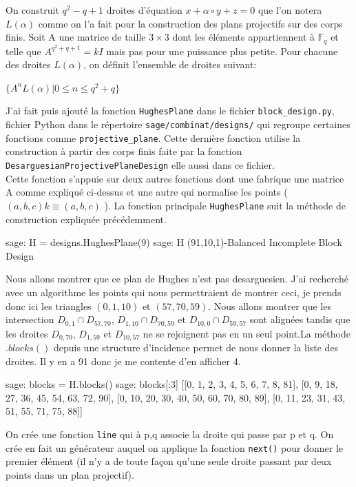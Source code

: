 \documentclass[a4paper]{article}
\begin{document}
        On construit $q^2-q+1$ droites d'équation $x + \alpha \circ y + z = 0$ que l'on notera $L(\alpha)$ comme on l'a fait pour la construction des plans projectifs sur des corps finis. Soit A une matrice de taille $3\times3$ dont les éléments appartiennent à $\mathbb{F}_q$ et telle que $A^{q^2+q+1}=kI$ mais pas pour une puissance plus petite. Pour chacune des droites $L(\alpha)$, on définit l'ensemble de droites suivant:
\begin{center}
 $ \{A^nL(\alpha) | 0 \leq n \leq q^2 + q\}$
\end{center}
\smallskip
J'ai fait puis ajouté la fonction \texttt{HughesPlane} dans le fichier \texttt{block\_design.py}, fichier Python dans le répertoire \texttt{sage/combinat/designs/} qui regroupe certaines fonctions comme \texttt{projective\_plane}. Cette dernière fonction utilise la construction à partir des corps finis faite par la fonction \\ \texttt{DesarguesianProjectivePlaneDesign} elle aussi dans ce fichier.\\
\newpage
Cette fonction s'appuie sur deux autres fonctions dont une fabrique une matrice A comme expliqué ci-dessus et une autre qui normalise les points ( $(a,b,c)k \equiv (a,b,c)$ ). La fonction principale \texttt{HughesPlane} suit la méthode de construction expliquée précédemment.
\begin{sageverbatim}
 sage: H = designs.HughesPlane(9)
 sage: H
 (91,10,1)-Balanced Incomplete Block Design
\end{sageverbatim}
Nous allons montrer que ce plan de Hughes n'est pas desarguesien. J'ai recherché avec un algorithme les points qui nous permettraient de montrer ceci, je prends donc ici les triangles $(0,1,10)$ et $(57, 70, 59)$. Nous allons montrer que les intersection $D_{0,1} \cap D_{57,70}$, $D_{1,10} \cap D_{70,59}$ et $D_{10,0} \cap D_{59,57}$ sont alignées tandis que les droites $D_{0,70}$, $D_{1,59}$ et $D_{10,57}$ ne se rejoignent pas en un seul point.La méthode $.blocks()$ depuis une structure d'incidence permet de nous donner la liste des droites. Il y en a 91 donc je me contente d'en afficher 4.
\begin{sageverbatim}
 sage: blocks = H.blocks()
 sage: blocks[:3]
 [[0, 1, 2, 3, 4, 5, 6, 7, 8, 81],
 [0, 9, 18, 27, 36, 45, 54, 63, 72, 90],
 [0, 10, 20, 30, 40, 50, 60, 70, 80, 89],
 [0, 11, 23, 31, 43, 51, 55, 71, 75, 88]]
\end{sageverbatim}
On crée une fonction \texttt{line} qui à p,q associe la droite qui passe par p et q. On crée en fait un générateur auquel on applique la fonction \texttt{next()} pour donner le premier élément (il n'y a de toute façon qu'une seule droite passant par deux points dans un plan projectif).
\end{document}
